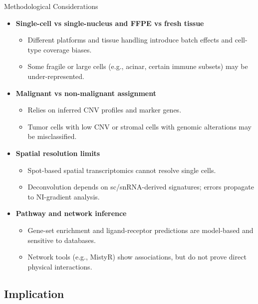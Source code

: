 \documentclass[10pt]{beamer}
\theoremstyle{plain}
\begin{document}
\begin{frame}{Methodological Considerations}
  \begin{itemize}
    \item \textbf{Single-cell vs single-nucleus and FFPE vs fresh tissue}
      \begin{itemize}
        \item Different platforms and tissue handling introduce batch effects and cell-type coverage biases.
        \item Some fragile or large cells (e.g., acinar, certain immune subsets) may be under-represented.
      \end{itemize}
    \item \textbf{Malignant vs non-malignant assignment}
      \begin{itemize}
        \item Relies on inferred CNV profiles and marker genes.
        \item Tumor cells with low CNV or stromal cells with genomic alterations may be misclassified.
      \end{itemize}
    \item \textbf{Spatial resolution limits}
      \begin{itemize}
        \item Spot-based spatial transcriptomics cannot resolve single cells.
        \item Deconvolution depends on sc/snRNA-derived signatures; errors propagate to NI-gradient analysis.
      \end{itemize}
    \item \textbf{Pathway and network inference}
      \begin{itemize}
        \item Gene-set enrichment and ligand-receptor predictions are model-based and sensitive to databases.
        \item Network tools (e.g., MistyR) show associations, but do not prove direct physical interactions.
      \end{itemize}
  \end{itemize}
\end{frame}

\subsection{Implication}
\end{document}
